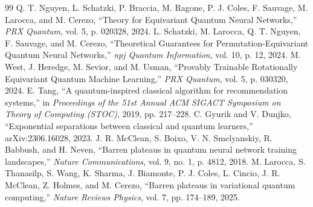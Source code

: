 \documentclass[sn-mathphys,Numbered]{sn-jnl}
\begin{document}
\begin{thebibliography}{99}
 Q. T. Nguyen, L. Schatzki, P. Braccia, M. Ragone, P. J. Coles, F. Sauvage, M. Larocca, and M. Cerezo, ``Theory for Equivariant Quantum Neural Networks,'' \textit{PRX Quantum}, vol. 5, p. 020328, 2024.
 L. Schatzki, M. Larocca, Q. T. Nguyen, F. Sauvage, and M. Cerezo, ``Theoretical Guarantees for Permutation-Equivariant Quantum Neural Networks,'' \textit{npj Quantum Information}, vol. 10, p. 12, 2024.
 M. West, J. Heredge, M. Sevior, and M. Usman, ``Provably Trainable Rotationally Equivariant Quantum Machine Learning,'' \textit{PRX Quantum}, vol. 5, p. 030320, 2024.
 E. Tang, ``A quantum-inspired classical algorithm for recommendation systems,'' in \textit{Proceedings of the 51st Annual ACM SIGACT Symposium on Theory of Computing (STOC)}, 2019, pp. 217--228.
 C. Gyurik and V. Dunjko, ``Exponential separations between classical and quantum learners,'' arXiv:2306.16028, 2023.
 J. R. McClean, S. Boixo, V. N. Smelyanskiy, R. Babbush, and H. Neven, ``Barren plateaus in quantum neural network training landscapes,'' \textit{Nature Communications}, vol. 9, no. 1, p. 4812, 2018.
 M. Larocca, S. Thanasilp, S. Wang, K. Sharma, J. Biamonte, P. J. Coles, L. Cincio, J. R. McClean, Z. Holmes, and M. Cerezo, ``Barren plateaus in variational quantum computing,'' \textit{Nature Reviews Physics}, vol. 7, pp. 174--189, 2025.
\end{thebibliography}
\end{document}
